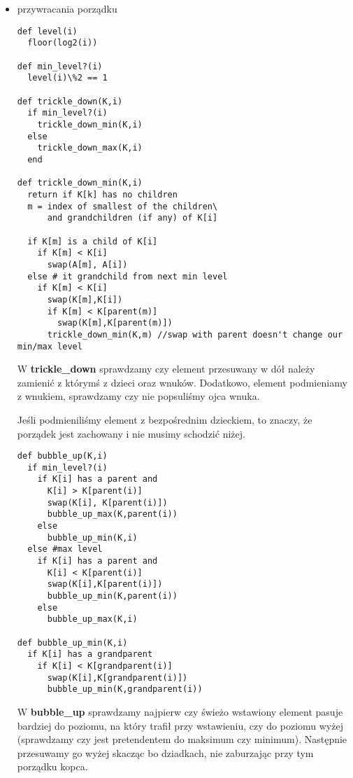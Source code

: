 \documentclass[svgnames]{report}
\begin{document}
\section{}%
\begin{itemize}
\item{przywracania porządku}
\begin{verbatim}
def level(i)
  floor(log2(i))

def min_level?(i)
  level(i)\%2 == 1

def trickle_down(K,i)
  if min_level?(i)
    trickle_down_min(K,i)
  else
    trickle_down_max(K,i)
  end

def trickle_down_min(K,i)
  return if K[k] has no children
  m = index of smallest of the children\
      and grandchildren (if any) of K[i]
  
  if K[m] is a child of K[i]
    if K[m] < K[i]
      swap(A[m], A[i])
  else # it grandchild from next min level
    if K[m] < K[i]
      swap(K[m],K[i])
      if K[m] < K[parent(m)]
        swap(K[m],K[parent(m)])
      trickle_down_min(K,m) //swap with parent doesn't change our min/max level
\end{verbatim}

W \textbf{trickle\_down} sprawdzamy czy element przesuwany w dół należy zamienić z którymś z dzieci oraz wnuków. Dodatkowo, element podmieniamy z wnukiem, sprawdzamy czy nie popsuliśmy ojca wnuka.

Jeśli podmieniliśmy element z bezpośrednim dzieckiem, to znaczy, że porządek jest zachowany i nie musimy schodzić niżej.

\begin{verbatim}
def bubble_up(K,i)
  if min_level?(i)
    if K[i] has a parent and
      K[i] > K[parent(i)]
      swap(K[i], K[parent(i)])
      bubble_up_max(K,parent(i))
    else
      bubble_up_min(K,i)
  else #max level
    if K[i] has a parent and
      K[i] < K[parent(i)]
      swap(K[i],K[parent(i)])
      bubble_up_min(K,parent(i))
    else
      bubble_up_max(K,i)

def bubble_up_min(K,i)
  if K[i] has a grandparent
    if K[i] < K[grandparent(i)]
      swap(K[i],K[grandparent(i)])
      bubble_up_min(K,grandparent(i))
\end{verbatim}
W \textbf{bubble\_up} sprawdzamy najpierw czy świeżo wstawiony element pasuje bardziej do poziomu, na który trafił przy wstawieniu, czy do poziomu wyżej (sprawdzamy czy jest pretendentem do maksimum czy minimum). Następnie przesuwamy go wyżej skacząc bo dziadkach, nie zaburzając przy tym porządku kopca.



\end{itemize}
\end{document}
